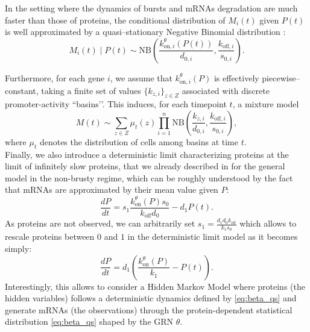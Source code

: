 In the setting where the dynamics of bursts and mRNAs degradation are much
faster than those of proteins, the conditional
distribution of $M_i(t)$ given $P(t)$ is well approximated by a
quasi–stationary Negative Binomial distribution \cite{herbach2018modelisation}:
\begin{equation}
M_i(t)\mid P(t)
 \sim \mathrm{NB}\!\left(
     \frac{k^{\theta}_{\mathrm{on},i}(P(t))}{d_{0,i}},
     \frac{k_{\mathrm{off},i}}{s_{0,i}}
   \right).
\label{eq:beta_qs}
\end{equation}

Furthermore, for each gene $i$, we assume that $k^{\theta}_{\mathrm{on},i}(P)$
is effectively piecewise–constant, taking a finite set of values
$\{k_{z,i}\}_{z\in Z}$ associated with discrete promoter-activity ``basins’’.
This induces, for each timepoint $t$, a mixture model
\begin{equation}
M(t) \sim \sum_{z\in Z} \mu_t(z)
         \prod_{i=1}^n 
         \mathrm{NB}\!\left(
           \frac{k_{z,i}}{d_{0,i}}, 
           \frac{k_{\mathrm{off},i}}{s_{0,i}}
         \right),
\label{eq:beta_mixture}
\end{equation}
where $\mu_t$ denotes the distribution of cells among basins at time $t$.\\

Finally, we also introduce a deterministic limit characterizing proteins at the limit of infinitely slow proteins, that we already described in \cite{ventre2022reverse} for the general model in the non-brusty regime, which can be roughly understood by the fact that mRNAs are approximated by their mean value given $P$:
\begin{equation*}
\frac{dP}{dt} = s_{1} \frac{k^{\theta}_{\mathrm{on}}(P)s_0}{k_{\mathrm{off}}d_0} - d_{1} P(t).
\end{equation*}
As proteins are not observed, we can arbitrarily set $s_1 = \frac{d_1 d_0 k_{\mathrm{off}}}{k_1 s_0}$ which allows to rescale proteins between $0$ and $1$ in the deterministic limit model as it becomes simply:
\begin{equation}
\label{eq:deterministic_model}
\frac{dP}{dt} = d_{1} \left(\frac{k^{\theta}_{\mathrm{on}}(P)}{k_1} - P(t)\right).
\end{equation}
Interestingly, this allows to consider a Hidden Markov Model where proteins (the hidden variables) follows a deterministic dynamics defined by \eqref{eq:beta_qs} and generate mRNAs (the observations) through the protein-dependent statistical distribution \eqref{eq:beta_qs} shaped by the GRN $\theta$.

